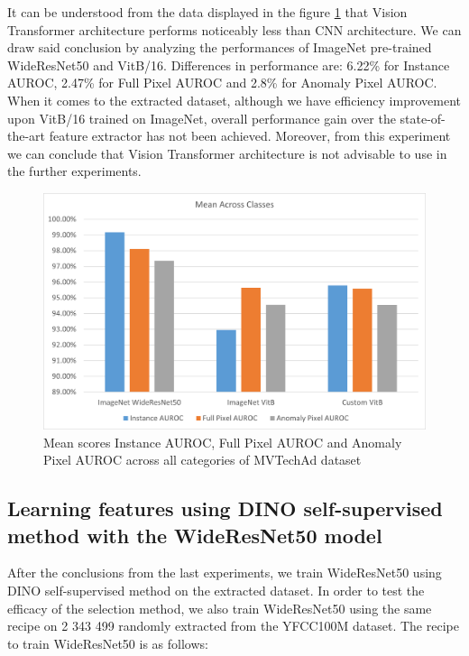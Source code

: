 It can be understood from the data displayed in the figure \ref{fig:vit_custom_test} that Vision Transformer architecture performs noticeably less than CNN architecture. We can draw said conclusion by analyzing the performances of ImageNet pre-trained WideResNet50 and VitB/16. Differences in performance are: 6.22\% for Instance AUROC, 2.47\% for Full Pixel AUROC and 2.8\% for Anomaly Pixel AUROC. When it comes to the extracted dataset, although we have efficiency improvement upon VitB/16 trained on ImageNet, overall performance gain over the state-of-the-art feature extractor has not been achieved. Moreover, from this experiment we can conclude that Vision Transformer architecture is not advisable to use in the further experiments.

\begin{figure}[t]
	\begin{center}
		\includegraphics[width=1.0\linewidth]{Chapter_4/vit_custom.png}
	\end{center}
	\caption{Mean scores Instance AUROC, Full Pixel AUROC and Anomaly Pixel AUROC across all categories of MVTechAd dataset}
	\label{fig:vit_custom_test}
\end{figure}

\subsection{Learning features using DINO self-supervised method with the WideResNet50 model}
After the conclusions from the last experiments, we train WideResNet50 using DINO self-supervised method on the extracted dataset. In order to test the efficacy of the selection method, we also train WideResNet50 using the same recipe on 2 343 499 randomly extracted from the YFCC100M dataset. The recipe to train WideResNet50 is as follows:

